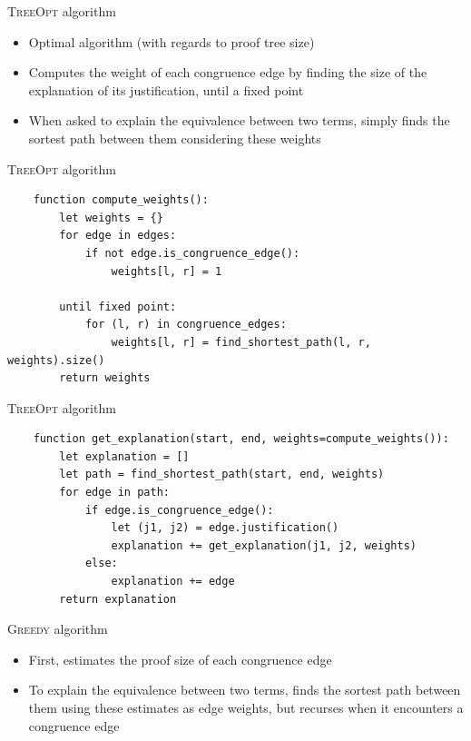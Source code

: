 \documentclass[aspectratio=169]{beamer}
\newcommand\vitem{\vfill\item}
\begin{document}
\begin{frame}{\textsc{TreeOpt} algorithm}
  \begin{itemize}
    \item Optimal algorithm (with regards to proof tree size)
    \vitem Computes the weight of each congruence edge by finding the size of
    the explanation of its justification, until a fixed point
    \vitem When asked to explain the equivalence between two terms, simply finds
    the sortest path between them considering these weights
  \end{itemize}
\end{frame}

\begin{frame}[fragile]{\textsc{TreeOpt} algorithm}
  \begin{verbatim}
    function compute_weights():
        let weights = {}
        for edge in edges:
            if not edge.is_congruence_edge():
                weights[l, r] = 1

        until fixed point:
            for (l, r) in congruence_edges:
                weights[l, r] = find_shortest_path(l, r, weights).size()
        return weights
  \end{verbatim}
\end{frame}

\begin{frame}[fragile]{\textsc{TreeOpt} algorithm}
  \begin{verbatim}
    function get_explanation(start, end, weights=compute_weights()):
        let explanation = []
        let path = find_shortest_path(start, end, weights)
        for edge in path:
            if edge.is_congruence_edge():
                let (j1, j2) = edge.justification()
                explanation += get_explanation(j1, j2, weights)
            else:
                explanation += edge
        return explanation
  \end{verbatim}
\end{frame}

\begin{frame}{\textsc{Greedy} algorithm}
  \begin{itemize}
    \item First, estimates the proof size of each congruence edge
    \vitem To explain the equivalence between two terms, finds the sortest path
    between them using these estimates as edge weights, but recurses when it
    encounters a congruence edge
  \end{itemize}
\end{frame}
\end{document}
